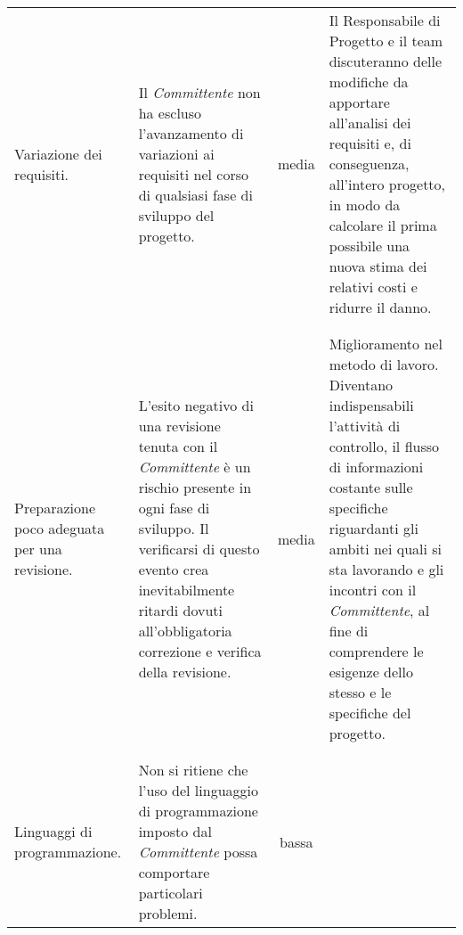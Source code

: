 {{\begin{table}[h!]
\begin{center}
\begin{minipage}{1\linewidth}
\begin{tabular}{l l c l}
\begin{minipage}{0.2\linewidth}
					Variazione \newline dei requisiti. 
					\end{minipage}
					&
					\begin{minipage}{0.3\linewidth}
					 Il \textit{Committente} non ha escluso l'avanzamento di variazioni ai requisiti nel corso di qualsiasi fase di sviluppo del progetto.
					\end{minipage}	
					& 
					media
					 &
					\begin{minipage}{0.3\linewidth}
					Il Responsabile di Progetto e il team discuteranno delle modifiche da apportare all’analisi dei requisiti e, di conseguenza, all’intero progetto, in modo da calcolare il prima possibile una nuova stima dei relativi costi e ridurre il danno.
					\end{minipage}	
					 \\
					 \\
					 \bottomrule
					\\
					\begin{minipage}{0.2\linewidth}
					Preparazione \newline poco adeguata \newline per una revisione.
					\end{minipage}
					& 
					\begin{minipage}{0.3\linewidth}
					L’esito negativo di una revisione tenuta con il \textit{Committente}  è un rischio presente in ogni fase di sviluppo. Il verificarsi di questo evento crea inevitabilmente ritardi dovuti all’obbligatoria correzione e verifica della revisione.
					\end{minipage}
					& 
					media
					&
					\begin{minipage}{0.3\linewidth}
					Miglioramento nel metodo di lavoro. Diventano indispensabili l’attività di controllo, il flusso di informazioni costante sulle specifiche riguardanti gli ambiti nei quali si sta lavorando e gli incontri con il \textit{Committente}, al fine di comprendere le esigenze dello stesso e le specifiche del progetto.
					\end{minipage}	
					\\
					\\
					\bottomrule
					\\
					\begin{minipage}{0.2\linewidth}
					Linguaggi di \newline programmazione.
					\end{minipage}
					&
					\begin{minipage}{0.3\linewidth}
					Non si ritiene che l’uso del linguaggio di programmazione imposto dal \textit{Committente} possa comportare particolari problemi.
					\end{minipage}	 
					&
					bassa
					\\  
					\bottomrule
					\end{tabular}
				\end{minipage}
			

\end{center}
\end{table}}}
